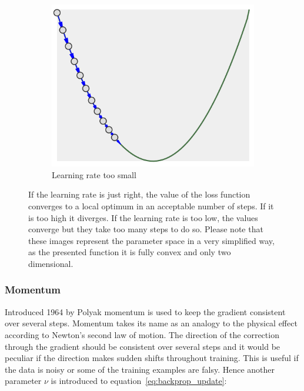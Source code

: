 \begin{figure}
    \begin{subfigure}[b]{0.3\textwidth}
        \includegraphics[width=\textwidth]{images/lr_too_low.png}
        \caption{Learning rate too small}
        \label{fig:lr_too-low}
    \end{subfigure}
    \caption{If the learning rate is just right, the value of the loss function converges to a local optimum in an acceptable number of steps.
    If it is too high it diverges.
    If the learning rate is too low, the values converge but they take too many steps to do so.
    Please note that these images represent the parameter space in a very simplified way, as the presented function it is fully convex and only two dimensional.}
\end{figure}

\subsubsection{Momentum}

Introduced 1964 by Polyak\cite{Polyak1964} momentum is used to keep the gradient consistent over several steps.
Momentum takes its name as an analogy to the physical effect according to Newton's second law of motion.
The direction of the correction through the gradient should be consistent over several steps and it would be peculiar if the direction makes sudden shifts throughout training.
This is useful if the data is noisy or some of the training examples are falsy.
Hence another parameter $\nu$ is introduced to equation~\eqref{eq:backprop_update}:

